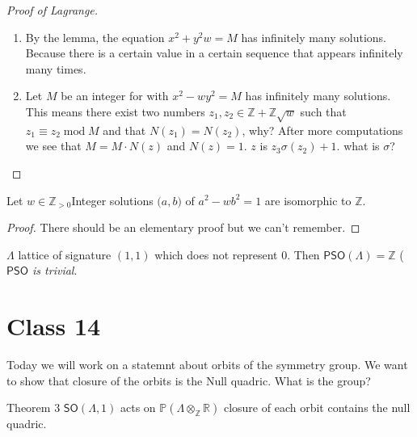 \begin{proof}[Proof of Lagrange]\leavevmode
	\begin{enumerate}[label=\textbf{Step \arabic*}]
		\item By the lemma, the equation $x^2+y^2w=M$ has infinitely many solutions. Because there is a certain value in a certain sequence that appears infinitely many times.

		\item Let $M$ be an integer for with  $x^2-wy^2=M$ has infinitely many solutions.  This means there exist two numbers $z_1,z_2\in\mathbb{Z}+\mathbb{Z}\sqrt{w} $ such that $z_1\equiv z_2\operatorname{mod}M$ and that $N(z_1)=N(z_2)$, {\color{6}why?} After more computations we see that $M=M\cdot N(z)$ and $N(z)=1$.  $z$ is  $z_3\sigma(z_2)+1$. {\color{7}what is $\sigma$?}
	\end{enumerate}
\end{proof}




\begin{thm}\leavevmode
	Let $w\in\mathbb{Z}_{> 0}$Integer solutions $\big(a,b\big)$ of $a^2-wb^2=1$ are isomorphic to $\mathbb{Z}$.
\end{thm}

\begin{proof}\leavevmode
	There should be an elementary proof but we can't remember.
\end{proof}

\begin{thm}\leavevmode
	$\Lambda$ lattice of signature $(1,1)$ which does not represent 0. Then  $\mathsf{PSO}(\Lambda)=\mathbb{Z}$ (\textit{$\mathsf{PSO}$ is trivial}.
\end{thm}


\section{Class 14}

Today we will work on a statemnt about orbits of the symmetry group. We want to show that closure of the orbits is the Null quadric. {\color{4}What is the group?}

\begin{thing4}{Theorem 3}\leavevmode
	$\mathsf{SO}(\Lambda,1)$ acts on $\mathbb{P}(\Lambda\otimes_\mathbb{Z}\mathbb{R})$ closure of each orbit contains the null quadric.
\end{thing4}


